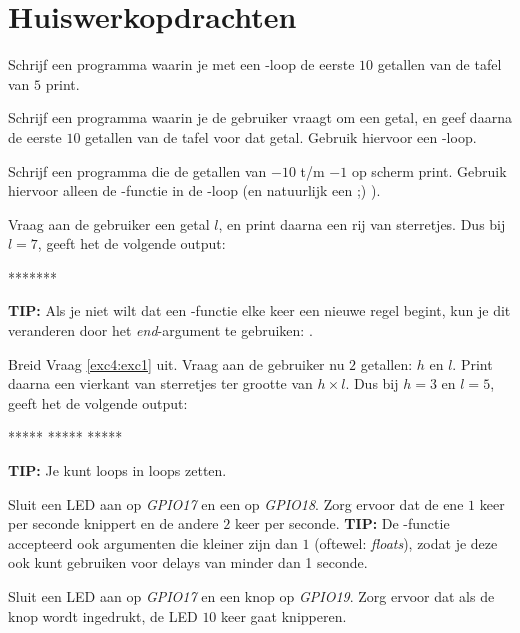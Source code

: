 \newpage

\section{Huiswerkopdrachten}
\begin{exercise}
Schrijf een programma waarin je met een -loop de eerste $10$ getallen van de tafel van $5$ print.
\end{exercise}

\begin{exercise}
Schrijf een programma waarin je de gebruiker vraagt om een getal, en geef daarna de eerste $10$ getallen van de tafel voor dat getal. Gebruik hiervoor een -loop.
\end{exercise}

\begin{exercise}
Schrijf een programma die de getallen van $-10$ t/m $-1$ op scherm print. Gebruik hiervoor alleen de -functie in de -loop (en natuurlijk een  ;) ).
\end{exercise}

\begin{exercise}\label{exc5:exc4}
Vraag aan de gebruiker een getal $l$, en print daarna een rij van sterretjes. Dus bij $l=7$, geeft het de volgende output:
\begin{python}
*******
\end{python}
\textbf{TIP:} Als je niet wilt dat een -functie elke keer een nieuwe regel begint, kun je dit veranderen door het \textit{end}-argument te gebruiken: . 
\end{exercise}


\begin{exercise}
Breid Vraag \ref{exc4:exc1} uit. Vraag aan de gebruiker nu $2$ getallen: $h$ en $l$. Print daarna een vierkant van sterretjes ter grootte van $h \times l$. Dus bij $h=3$ en $l=5$, geeft het de volgende output:
\begin{python}
*****
*****
*****
\end{python}
\textbf{TIP:} Je kunt loops in loops zetten. 
\end{exercise}

\begin{exercise}
Sluit een LED aan op \textit{GPIO17} en een op \textit{GPIO18}. Zorg ervoor dat de ene $1$ keer per seconde knippert en de andere $2$ keer per seconde. \newline
\textbf{TIP:} De -functie accepteerd ook argumenten die kleiner zijn dan $1$ (oftewel: \textit{floats}), zodat je deze ook kunt gebruiken voor delays van minder dan 1 seconde.
\end{exercise}

\begin{exercise}
Sluit een LED aan op \textit{GPIO17} en een knop op \textit{GPIO19}. Zorg ervoor dat als de knop wordt ingedrukt, de LED $10$ keer gaat knipperen. 
\end{exercise}

